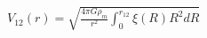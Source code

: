 \documentclass[convert={convertexe={magick.exe}, density=300}]{standalone}
\begin{document}
$V_{12}(r) = \sqrt{\frac{4\pi G \rho_m}{r^2} \int_0^{r_{12}}\xi(R) R^2 dR}$
\end{document}
